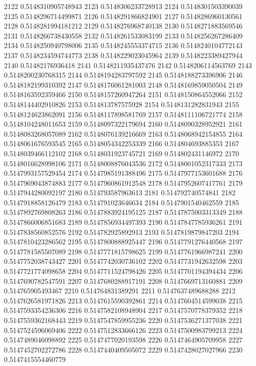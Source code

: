 2122 0.5148310905748943
2123 0.5148306233728913
2124 0.5148301503390039
2125 0.5148296714499871
2126 0.5148291866824901
2127 0.5148286960130561
2128 0.5148281994181212
2129 0.5148276968740138
2130 0.5148271883569546
2131 0.5148266738430558
2132 0.5148261533083199
2133 0.5148256267286409
2134 0.5148250940798006
2135 0.5148245553374715
2136 0.5148240104772143
2137 0.5148234594744773
2138 0.5148229023045964
2139 0.5148223389427944
2140 0.51482176936418
2141 0.5148211935437476
2142 0.5148206114563769
2143 0.5148200230768315
2144 0.5148194283797592
2145 0.5148188273396906
2146 0.5148182199310392
2147 0.5148176061281003
2148 0.5148169859050504
2149 0.5148163592359466
2150 0.5148157260947264
2151 0.5148150864552066
2152 0.5148144402910826
2153 0.514813787575928
2154 0.5148131282831943
2155 0.5148124623862091
2156 0.5148117898581769
2157 0.5148111106721774
2158 0.5148104248011653
2159 0.5148097322179694
2160 0.5148090328952921
2161 0.5148083268057089
2162 0.5148076139216669
2163 0.5148068942154855
2164 0.5148061676593545
2165 0.5148054342253339
2166 0.514804693885353
2167 0.5148039466112102
2168 0.5148031923745721
2169 0.514802431146972
2170 0.5148016628998106
2171 0.5148008876043536
2172 0.5148001052317333
2173 0.5147993157529454
2174 0.5147985191388496
2175 0.5147977153601688
2176 0.5147969043874883
2177 0.5147960861912548
2178 0.5147952607417761
2179 0.5147944280092197
2180 0.514793587963613
2181 0.514792740574841
2182 0.5147918858126479
2183 0.514791023646634
2184 0.5147901540462559
2185 0.5147892769808263
2186 0.5147883924195125
2187 0.5147875003313349
2188 0.5147866006851683
2189 0.5147856934497393
2190 0.5147847785936261
2191 0.5147838560852576
2192 0.514782925892913
2193 0.5147819879847203
2194 0.5147810423286562
2195 0.5147800888925447
2196 0.5147791276440568
2197 0.5147781585507089
2198 0.5147771815798625
2199 0.5147761966987241
2200 0.5147752038743427
2201 0.5147742030736102
2202 0.5147731942632598
2203 0.5147721774098658
2204 0.5147711524798426
2205 0.5147701194394434
2206 0.5147690782547591
2207 0.5147680288917191
2208 0.5147669713160881
2209 0.514765905493467
2210 0.514764831389291
2211 0.5147637489688288
2212 0.5147626581971826
2213 0.5147615590392861
2214 0.5147604514599038
2215 0.5147593354236306
2216 0.5147582108948904
2217 0.5147570778379352
2218 0.5147559362168443
2219 0.5147547859955236
2220 0.5147536271377038
2221 0.5147524596069406
2222 0.5147512833666126
2223 0.5147500983799213
2224 0.5147489046098892
2225 0.5147477020193598
2226 0.5147464905709958
2227 0.5147452702272786
2228 0.5147440409505072
2229 0.5147428027027966
2230 0.5147415554460779
